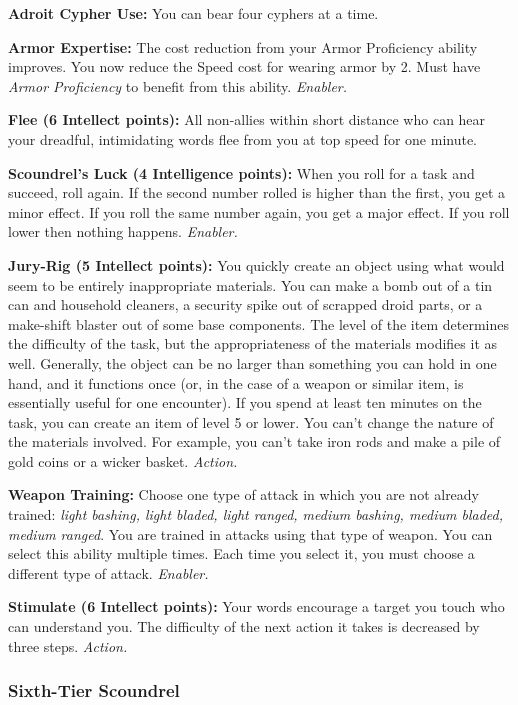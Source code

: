 \documentclass[a4paper,10pt,final,twocolumn,oneside]{book}
\newcommand{\itemAbility}[2]{\textcolor{25gray}{\textbullet\textbf{ #1:}}{ #2}\par}
\newcommand{\enabler}{\textit{ Enabler.}}
\newcommand{\action}{\textit{ Action.}}
\begin{document}
\itemAbility{Adroit Cypher Use}{You can bear four cyphers at a time.}

\itemAbility{Armor Expertise}{The cost reduction from your Armor Proficiency ability improves. You now reduce the Speed cost for wearing armor by 2. Must have \textit{Armor Proficiency} to benefit from this ability.\enabler}

\itemAbility{Flee (6 Intellect points)}{All non-allies within short distance who can hear your dreadful, intimidating words flee from you at top speed for one minute.}

\itemAbility{Scoundrel's Luck (4 Intelligence points)}{When you roll for a task and succeed, roll again. If the second number rolled is higher than the first, you get a minor effect. If you roll the same number again, you get a major effect. If you roll lower then nothing happens. \enabler}

\itemAbility{Jury-Rig (5 Intellect points)}{You quickly create an object using what would seem to be entirely inappropriate materials. You can make a bomb out of a tin can and household cleaners, a security spike out of scrapped droid parts, or a make-shift blaster out of some base components. The level of the item determines the difficulty of the task, but the appropriateness of the materials modifies it as well. Generally, the object can be no larger than something you can hold in one hand, and it functions once (or, in the case of a weapon or similar item, is essentially useful for one encounter). If you spend at least ten minutes on the task, you can create an item of level 5 or lower. You can’t change the nature of the materials involved. For example, you can’t take iron rods and make a pile of gold coins or a wicker basket.\action}

\itemAbility{Weapon Training}{Choose one type of attack in which you are not already trained: \textit{light bashing, light bladed, light ranged, medium bashing, medium bladed, medium ranged}. You are trained in attacks using that type of weapon. You can select this ability multiple times. Each time you select it, you must choose a different type of attack.\enabler}

\itemAbility{Stimulate (6 Intellect points)}{Your words encourage a target you touch who can understand you. The difficulty of the next action it takes is decreased by three steps.\action}


\subsubsection*{Sixth-Tier Scoundrel}
\label{subsub:scoundrelSixthTier}
\end{document}
